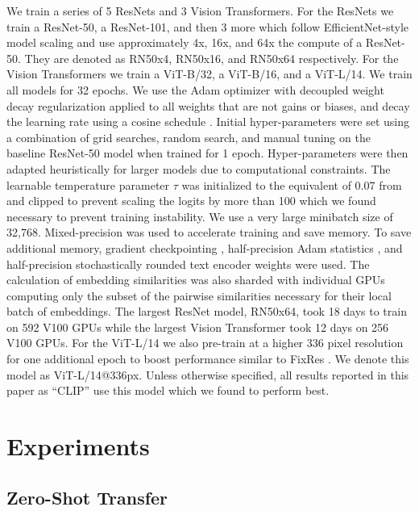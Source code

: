 We train a series of 5 ResNets and 3 Vision Transformers. For the ResNets we train a ResNet-50, a ResNet-101, and then 3 more which follow EfficientNet-style model scaling and use approximately 4x, 16x, and 64x the compute of a ResNet-50. They are denoted as RN50x4, RN50x16, and RN50x64 respectively. For the Vision Transformers we train a ViT-B/32, a ViT-B/16, and a ViT-L/14. We train all models for 32 epochs. We use the Adam optimizer \citep{kingma2014adam} with decoupled weight decay regularization \citep{loshchilov2017decoupled} applied to all weights that are not gains or biases, and decay the learning rate using a cosine schedule \citep{loshchilov2016sgdr}. Initial hyper-parameters were set using a combination of grid searches, random search, and manual tuning on the baseline ResNet-50 model when trained for 1 epoch. Hyper-parameters were then adapted heuristically for larger models due to computational constraints. The learnable temperature parameter $\tau$ was initialized to the equivalent of 0.07 from \citep{wu2018unsupervised} and clipped to prevent scaling the logits by more than 100 which we found necessary to prevent training instability. We use a very large minibatch size of 32,768. Mixed-precision \citep{micikevicius2017mixed} was used to accelerate training and save memory. To save additional memory, gradient checkpointing \citep{griewank2000algorithm,chen2016training}, half-precision Adam statistics \citep{dhariwal2020jukebox}, and half-precision stochastically rounded text encoder weights were used. The calculation of embedding similarities was also sharded with individual GPUs computing only the subset of the pairwise similarities necessary for their local batch of embeddings. The largest ResNet model, RN50x64, took 18 days to train on 592 V100 GPUs while the largest Vision Transformer took 12 days on 256 V100 GPUs. For the ViT-L/14 we also pre-train at a higher 336 pixel resolution for one additional epoch to boost performance similar to FixRes \citep{touvron2019fixing}. We denote this model as ViT-L/14@336px. Unless otherwise specified, all results reported in this paper as ``CLIP'' use this model which we found to perform best.

\section{Experiments}

\subsection{Zero-Shot Transfer}
\label{subsection:zero_shot_transfer}

